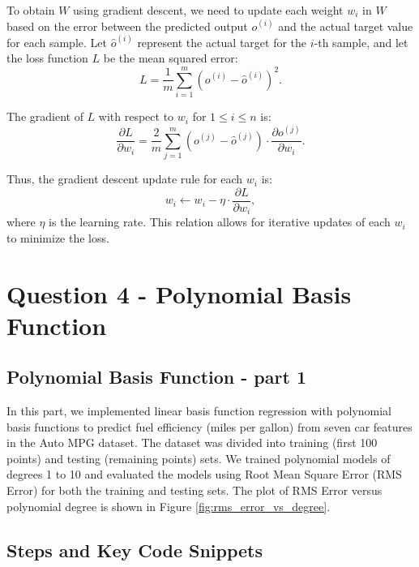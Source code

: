 \documentclass{article}
\begin{document}
	To obtain \(W\) using gradient descent, we need to update each weight \(w_i\) in \(W\) based on the error between the predicted output \(o^{(i)}\) and the actual target value for each sample. Let \(\hat{o}^{(i)}\) represent the actual target for the \(i\)-th sample, and let the loss function \(L\) be the mean squared error:
	\[
	L = \frac{1}{m} \sum_{i=1}^m (o^{(i)} - \hat{o}^{(i)})^2.
	\]
	
	The gradient of \(L\) with respect to \(w_i\) for \(1 \le i \le n\) is:
	\[
	\frac{\partial L}{\partial w_i} = \frac{2}{m} \sum_{j=1}^m (o^{(j)} - \hat{o}^{(j)}) \cdot \frac{\partial o^{(j)}}{\partial w_i}.
	\]
	
	Thus, the gradient descent update rule for each \(w_i\) is:
	\[
	w_i \leftarrow w_i - \eta \cdot \frac{\partial L}{\partial w_i},
	\]
	where \(\eta\) is the learning rate. This relation allows for iterative updates of each \(w_i\) to minimize the loss.
	
	\newpage
	\section*{Question 4 - Polynomial Basis Function}
	\subsection*{Polynomial Basis Function - part 1}
	In this part, we implemented linear basis function regression with polynomial basis functions to predict fuel efficiency (miles per gallon) from seven car features in the Auto MPG dataset. The dataset was divided into training (first 100 points) and testing (remaining points) sets. We trained polynomial models of degrees 1 to 10 and evaluated the models using Root Mean Square Error (RMS Error) for both the training and testing sets. The plot of RMS Error versus polynomial degree is shown in Figure \ref{fig:rms_error_vs_degree}.
	
	\subsection*{Steps and Key Code Snippets}
	
\end{document}
